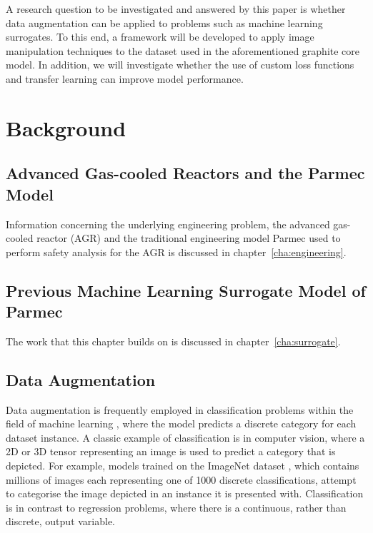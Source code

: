 \noindent
A research question to be investigated and answered by this paper is whether data augmentation can be applied to problems such as machine learning surrogates. To this end, a framework will be developed to apply image manipulation techniques to the dataset used in the aforementioned graphite core model. In addition, we will investigate whether the use of custom loss functions and transfer learning can improve model performance.


\section{Background} \label{Background}

\subsection{Advanced Gas-cooled Reactors and the Parmec Model} \label{Parmec}

Information concerning the underlying engineering problem, the advanced gas-cooled reactor (AGR) and the traditional engineering model Parmec used to perform safety analysis for the AGR is discussed in chapter~\ref{cha:engineering}.

\subsection{Previous Machine Learning Surrogate Model of Parmec} \label{previous}

The work that this chapter builds on is discussed in chapter~\ref{cha:surrogate}.

\subsection{Data Augmentation} \label{augmentation}


Data augmentation is frequently employed in classification problems within the field of machine learning \cite{shorten2019survey}, where the model predicts a discrete category for each dataset instance. A classic example of classification is in computer vision, where a 2D or 3D tensor representing an image is used to predict a category that is depicted. For example, models trained on the ImageNet dataset \cite{deng2009imagenet}, which contains millions of images each representing one of 1000 discrete classifications, attempt to categorise the image depicted in an instance it is presented with. Classification is in contrast to regression problems, where there is a continuous, rather than discrete, output variable.
\\

